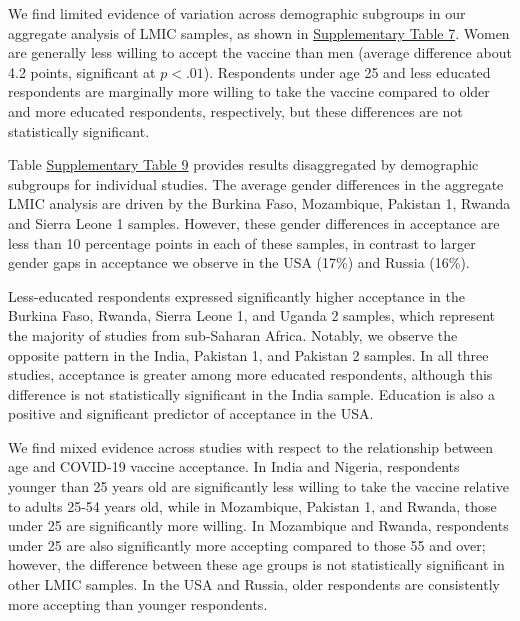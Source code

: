 \documentclass[
  12pt,
]{article}
\begin{document}
We find limited evidence of variation across demographic subgroups in our aggregate analysis of LMIC samples, as shown in \hyperref[tab:dmeans]{Supplementary Table 7}. Women are generally less willing to accept the vaccine than men (average difference about 4.2 points, significant at \(p<.01\)). Respondents under age 25 and less educated respondents are marginally more willing to take the vaccine compared to older and more educated respondents, respectively, but these differences are not statistically significant.

Table \hyperref[tab:countrydiff]{Supplementary Table 9} provides results disaggregated by demographic subgroups for individual studies. The average gender differences in the aggregate LMIC analysis are driven by the Burkina Faso, Mozambique, Pakistan 1, Rwanda and Sierra Leone 1 samples. However, these gender differences in acceptance are less than 10 percentage points in each of these samples, in contrast to larger gender gaps in acceptance we observe in the USA (17\%) and Russia (16\%).

Less-educated respondents expressed significantly higher acceptance in the Burkina Faso, Rwanda, Sierra Leone 1, and Uganda 2 samples, which represent the majority of studies from sub-Saharan Africa. Notably, we observe the opposite pattern in the India, Pakistan 1, and Pakistan 2 samples. In all three studies, acceptance is greater among more educated respondents, although this difference is not statistically significant in the India sample. Education is also a positive and significant predictor of acceptance in the USA.

We find mixed evidence across studies with respect to the relationship between age and COVID-19 vaccine acceptance. In India and Nigeria, respondents younger than 25 years old are significantly less willing to take the vaccine relative to adults 25-54 years old, while in Mozambique, Pakistan 1, and Rwanda, those under 25 are significantly more willing. In Mozambique and Rwanda, respondents under 25 are also significantly more accepting compared to those 55 and over; however, the difference between these age groups is not statistically significant in other LMIC samples. In the USA and Russia, older respondents are consistently more accepting than younger respondents.
\end{document}
